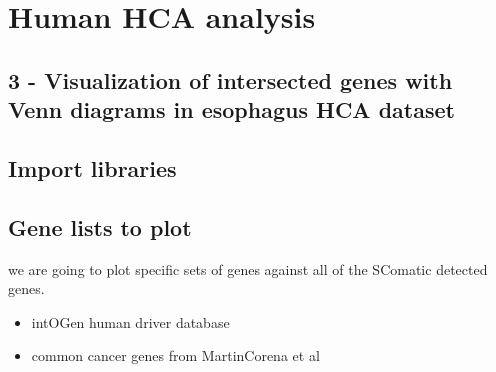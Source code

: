 \documentclass[
  letterpaper,
  DIV=11,
  numbers=noendperiod]{scrreprt}
\newenvironment{Shaded}{\begin{snugshade}}{\end{snugshade}}
\newcommand{\NormalTok}[1]{\textcolor[rgb]{0.00,0.23,0.31}{#1}}
\providecommand{\tightlist}{%
  \setlength{\itemsep}{0pt}\setlength{\parskip}{0pt}}\usepackage{longtable,booktabs,array}
\begin{document}
\part{Human HCA analysis}

\chapter{3 - Visualization of intersected genes with Venn diagrams in
esophagus HCA
dataset}\label{visualization-of-intersected-genes-with-venn-diagrams-in-esophagus-hca-dataset}

\chapter{Import libraries}\label{import-libraries-1}

\begin{Shaded}
\end{Shaded}

\chapter{Gene lists to plot}\label{gene-lists-to-plot}

we are going to plot specific sets of genes against all of the SComatic
detected genes.

\begin{itemize}
\tightlist
\item
  intOGen human driver database
\item
  common cancer genes from MartinCorena et al
\end{itemize}
\end{document}
